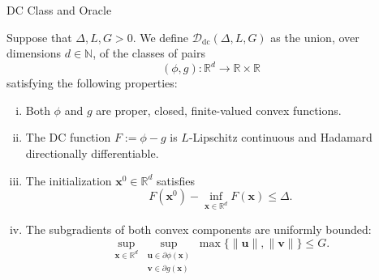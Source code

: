 \documentclass[10pt]{beamer}
\begin{document}
\begin{frame}{DC Class and Oracle}
\footnotesize
\vspace{0.3cm}

\medskip
{}

\medskip
\begin{dfn}
Suppose that \(\Delta,L,G>0\). We define
\(\mathcal D_{\mathrm{dc}}(\Delta,L,G)\) as the union, over dimensions \(d\in\mathbb N\),
of the classes of pairs
\[
(\phi,g):\mathbb R^d\to\mathbb R\times\mathbb R
\]
satisfying the following properties:
\begin{enumerate}[(i)]
    \item Both \(\phi\) and \(g\) are proper, closed, finite-valued convex functions.
    
    \item The DC function \(F:=\phi-g\) is \(L\)-Lipschitz continuous and Hadamard directionally differentiable.
    
    \item The initialization \(\mathbf{x}^0\in\mathbb R^d\) satisfies
    \[
    F(\mathbf{x}^0)-\inf_{\mathbf{x}\in\mathbb R^d}F(\mathbf{x})\leq\Delta.
    \]
    
    \item The subgradients of both convex components are uniformly bounded:
    \[
    \sup_{\mathbf{x}\in\mathbb R^d}
    \sup_{\substack{\mathbf{u}\in\partial\phi(\mathbf{x})\\
                    \mathbf{v}\in\partial g(\mathbf{x})}}
    \max\{\|\mathbf{u}\|,\|\mathbf{v}\|\}
    \leq G.
    \]
\end{enumerate}
\end{dfn}

\end{frame}

\end{document}
